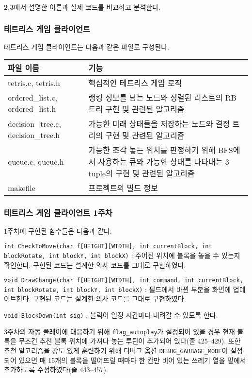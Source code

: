 \textbf{2.3}에서 설명한 이론과 실제 코드를 비교하고 분석한다.

\subsubsection{테트리스 게임 클라이언트}
테트리스 게임 클라이언트는 다음과 같은 파일로 구성된다. 

\begin{tabularx}{\linewidth}{l|X}
    파일 이름 & 기능 \\
    \hline
    tetris.c, tetris.h & 핵심적인 테트리스 게임 로직 \\
    \hline
    ordered_list.c, ordered_list.h & 랭킹 정보를 담는 노드와 정렬된 리스트의 RB 트리 구현 및 관련된 알고리즘 \\
    decision_tree.c, decision_tree.h & 가능한 미래 상태들을 저장하는 노드와 결정 트리의 구현 및 관련된 알고리즘 \\
    queue.c, queue.h & 가능한 조각 놓는 위치를 판정하기 위해 BFS에서 사용하는 큐와 가능한 상태를 나타내는 3-tuple의 구현 및 관련된 알고리즘 \\
    \hline
    makefile & 프로젝트의 빌드 정보 \\
\end{tabularx}

\subsubsection{테트리스 게임 클라이언트 1주차} 1주차에 구현된 함수들은 다음과 같다.

\texttt{int CheckToMove(char f[HEIGHT][WIDTH], int currentBlock, int blockRotate, int blockY, int blockX)}
: 주어진 위치에 블록을 놓을 수 있는지 확인한다. 구현된 코드는 설계한 의사 코드를 그대로 구현하였다.

\texttt{void DrawChange(char f[HEIGHT][WIDTH], int command, int currentBlock, int blockRotate, int blockY, int blockX)}
: 필드에서 바뀐 부분을 화면에 업데이트한다. 구현된 코드는 설계한 의사 코드를 그대로 구현하였다.

\texttt{void BlockDown(int sig)}
: 블럭이 일정 시간마다 내려갈 수 있도록 한다.

3주차의 자동 플레이에 대응하기 위해 \texttt{flag_autoplay}가 설정되어 있을 경우 현재 블록을 무조건 추천 블록 위치에 가져다 놓는 루틴이 추가되어 있다(줄 425--429).
또한 추천 알고리즘을 강도 있게 훈련하기 위해 디버그 옵션 \texttt{DEBUG_GARBAGE_MODE}이 설정되어 있으면 매 15개의 블록을 떨어뜨릴 때마다
한 칸만 비어 있는 쓰레기 열을 밑에서 추가하도록 수정하였다(줄 443--457). 

